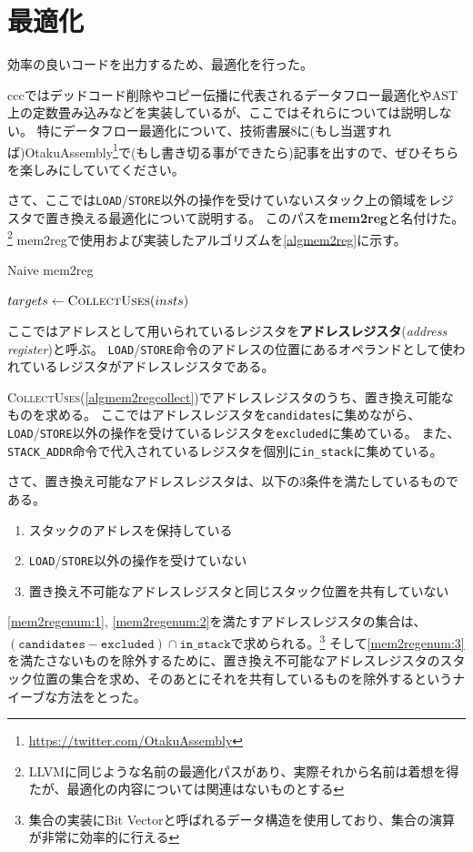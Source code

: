 \documentclass[uplatex,a4paper]{jsarticle}
\begin{document}
\clearpage
\section{最適化}

効率の良いコードを出力するため、最適化を行った。

cccではデッドコード削除やコピー伝播に代表されるデータフロー最適化やAST上の定数畳み込みなどを実装しているが、ここではそれらについては説明しない。
特にデータフロー最適化について、技術書展8に(もし当選すれば)OtakuAssembly\footnote{\url{https://twitter.com/OtakuAssembly}}で(もし書き切る事ができたら)記事を出すので、ぜひそちらを楽しみにしていてください。

さて、ここでは\texttt{LOAD}/\texttt{STORE}以外の操作を受けていないスタック上の領域をレジスタで置き換える最適化について説明する。
このパスを\textbf{mem2reg}と名付けた。\footnote{LLVMに同じような名前の最適化パスがあり、実際それから名前は着想を得たが、最適化の内容については関連はないものとする}
mem2regで使用および実装したアルゴリズムを\cref{algmem2reg}に示す。

\begin{algorithm}[h]
\caption{Naive mem2reg}\label{algmem2reg}
\begin{algorithmic}[1]
  \State $targets \gets \Call{CollectUses}{insts}$
  \State {}
\EndProcedure
\end{algorithmic}
\end{algorithm}

ここではアドレスとして用いられているレジスタを\textbf{アドレスレジスタ}(\textit{address register})と呼ぶ。
\texttt{LOAD}/\texttt{STORE}命令のアドレスの位置にあるオペランドとして使われているレジスタがアドレスレジスタである。

\textsc{CollectUses}(\cref{algmem2regcollect})でアドレスレジスタのうち、置き換え可能なものを求める。
ここではアドレスレジスタを\texttt{candidates}に集めながら、\texttt{LOAD}/\texttt{STORE}以外の操作を受けているレジスタを\texttt{excluded}に集めている。
また、\texttt{STACK\_ADDR}命令で代入されているレジスタを個別に\texttt{in\_stack}に集めている。

さて、置き換え可能なアドレスレジスタは、以下の3条件を満たしているものである。
\begin{enumerate}
  \item \label{mem2regenum:1}スタックのアドレスを保持している
  \item \label{mem2regenum:2}\texttt{LOAD}/\texttt{STORE}以外の操作を受けていない
  \item \label{mem2regenum:3}置き換え不可能なアドレスレジスタと同じスタック位置を共有していない
\end{enumerate}
\cref{mem2regenum:1}, \cref{mem2regenum:2}を満たすアドレスレジスタの集合は、$(\texttt{candidates} - \texttt{excluded}) \cap {\texttt{in\_stack}}$で求められる。\footnote{集合の実装にBit Vectorと呼ばれるデータ構造を使用しており、集合の演算が非常に効率的に行える}
そして\cref{mem2regenum:3}を満たさないものを除外するために、置き換え不可能なアドレスレジスタのスタック位置の集合を求め、そのあとにそれを共有しているものを除外するというナイーブな方法をとった。
\end{document}
